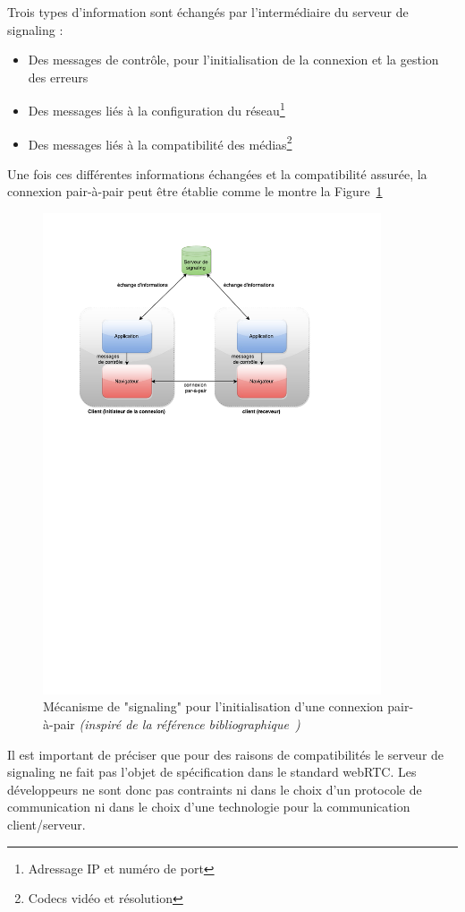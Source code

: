 \documentclass{tnreport}
\begin{document}
Trois types d'information sont échangés par l'intermédiaire du serveur de signaling :
\begin{itemize}
    \item Des messages de contrôle, pour l'initialisation de la connexion et la gestion des erreurs
    \item Des messages liés à la configuration du réseau\footnote{Adressage IP et numéro de port}
    \item Des messages liés à la compatibilité des médias\footnote{Codecs vidéo et résolution}\\
\end{itemize}

Une fois ces différentes informations échangées et la compatibilité assurée, la connexion pair-à-pair peut être établie comme le montre la Figure~\ref{fig:signaling}

\begin{figure}[!h]
  \centering
  \includegraphics[width=10cm]{figures/signaling}
  \caption{Mécanisme de "signaling" pour l'initialisation d'une connexion pair-à-pair \emph{(inspiré de la référence bibliographique~\cite{GettingStartedwithWebRTC})}}
  \label{fig:signaling}
\end{figure}

Il est important de préciser que pour des raisons de compatibilités le serveur de signaling ne fait pas l'objet de spécification dans le standard webRTC. Les développeurs ne sont donc pas contraints ni dans le choix d'un protocole de communication ni dans le choix d'une technologie pour la communication client/serveur.
\end{document}
